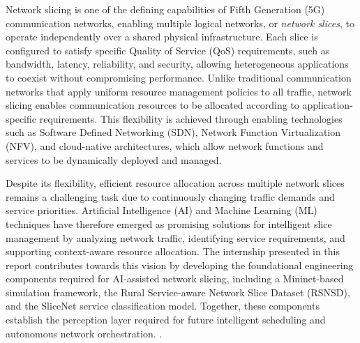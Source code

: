\documentclass[12pt,a4paper]{report}
\begin{document}
Network slicing is one of the defining capabilities of Fifth Generation (5G) communication networks, enabling multiple logical networks, or \emph{network slices}, to operate independently over a shared physical infrastructure. Each slice is configured to satisfy specific Quality of Service (QoS) requirements, such as bandwidth, latency, reliability, and security, allowing heterogeneous applications to coexist without compromising performance. Unlike traditional communication networks that apply uniform resource management policies to all traffic, network slicing enables communication resources to be allocated according to application-specific requirements. This flexibility is achieved through enabling technologies such as Software Defined Networking (SDN), Network Function Virtualization (NFV), and cloud-native architectures, which allow network functions and services to be dynamically deployed and managed.

Despite its flexibility, efficient resource allocation across multiple network slices remains a challenging task due to continuously changing traffic demands and service priorities. Artificial Intelligence (AI) and Machine Learning (ML) techniques have therefore emerged as promising solutions for intelligent slice management by analyzing network traffic, identifying service requirements, and supporting context-aware resource allocation. The internship presented in this report contributes towards this vision by developing the foundational engineering components required for AI-assisted network slicing, including a Mininet-based simulation framework, the Rural Service-aware Network Slice Dataset (RSNSD), and the SliceNet service classification model. Together, these components establish the perception layer required for future intelligent scheduling and autonomous network orchestration.
.
	
\end{document}
